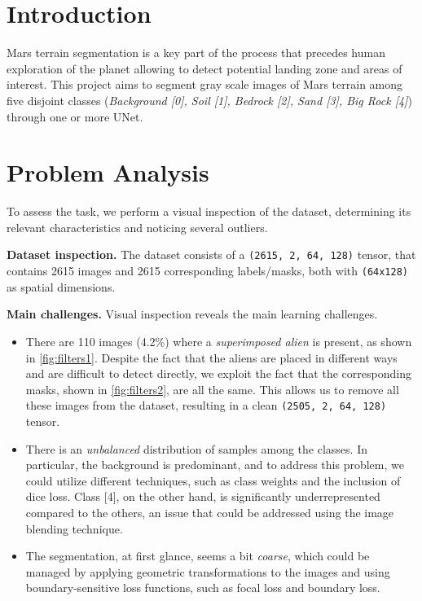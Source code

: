 \documentclass[11pt]{template}
\begin{document}
\head

\begin{multicols}{2}

       
\section{Introduction} Mars terrain segmentation is a key part of the process that precedes human exploration of the planet allowing to detect potential landing zone and areas of interest. This project aims to segment gray scale images of Mars terrain among five disjoint classes (\emph{Background [0], Soil [1], Bedrock [2], Sand [3], Big Rock [4]}) through one or more UNet.

\section{Problem Analysis}
To assess the task, we perform a visual inspection of the dataset, determining its relevant characteristics and noticing several outliers.

\textbf{Dataset inspection.}
The dataset consists of a \texttt{(2615, 2, 64, 128)} tensor, that contains 2615 images and 2615 corresponding labels/masks, both with \texttt{(64x128)} as spatial dimensions.

\textbf{Main challenges.}
Visual inspection reveals the main learning challenges.
\begin{itemize}
    \item There are 110 images (4.2\%) where a \textit{superimposed alien} is present, as shown in \ref{fig:filters1}. Despite the fact that the aliens are placed in different ways and are difficult to detect directly, we exploit the fact that the corresponding masks, shown in \ref{fig:filters2}, are all the same. This allows us to remove all these images from the dataset, resulting in a clean \texttt{(2505, 2, 64, 128)} tensor.
    \item There is an \emph{unbalanced} distribution of samples among the classes. In particular, the background is predominant, and to address this problem, we could utilize different techniques, such as class weights and the inclusion of dice loss. Class [4], on the other hand, is significantly underrepresented compared to the others, an issue that could be addressed using the image blending technique.
    \item The segmentation, at first glance, seems a bit \textit{coarse}, which could be managed by applying geometric transformations to the images and using boundary-sensitive loss functions, such as focal loss and boundary loss.
\end{itemize}



\end{multicols}
\end{document}
